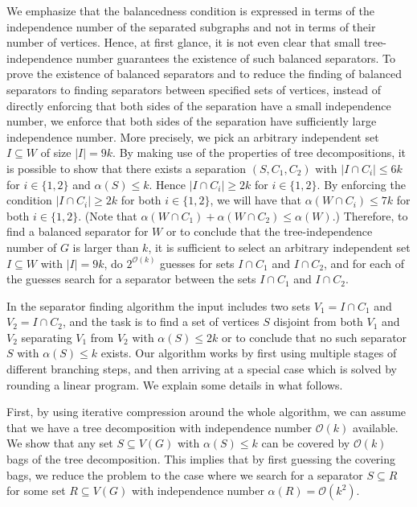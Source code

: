 \documentclass[11pt]{article}
\theoremstyle{definition}
\newcommand{\OO}{\mathcal{O}}
\begin{document}
We emphasize that the balancedness condition is expressed in terms of the independence number of the separated subgraphs and not in terms of their number of vertices.
Hence, at first glance, it is not even clear that small tree-independence number guarantees the existence of such balanced separators.
To prove the existence of balanced separators and to reduce the finding of balanced separators to finding separators between specified sets of vertices, instead of directly enforcing that both sides of the separation have a small independence number, we enforce that both sides of the separation have sufficiently large independence number.
More precisely, we pick an arbitrary independent set $I \subseteq W$ of size $|I| = 9k$. By making use of the properties of tree decompositions,  it is possible to show that there exists a separation $(S, C_1, C_2)$ with $|I \cap C_i| \le 6k$ for $i \in \{1,2\}$ and $\alpha(S) \le k$. Hence  $|I \cap C_i| \ge 2k$ for $i \in \{1,2\}$.
By enforcing the condition  $|I \cap C_i| \ge 2k$ for both $i \in \{1,2\}$, we will have  that $\alpha(W \cap C_i) \le 7k$ for both $i \in \{1,2\}$. (Note that  $\alpha(W \cap C_1) + \alpha(W \cap C_2) \le \alpha(W)$.)
Therefore, to find a balanced separator for $W$ or to conclude that the tree-independence number of $G$ is larger than $k$, it is sufficient to select an arbitrary independent set $I \subseteq W$ with $|I| = 9k$, do $2^{\OO(k)}$ guesses for sets $I \cap C_1$ and $I \cap C_2$, and for each of the guesses search for a separator between the sets $I \cap C_1$ and $I \cap C_2$.


In the separator finding algorithm the input includes two sets $V_1 = I \cap C_1$ and $V_2 = I \cap C_2$, and the task is to find a set of vertices $S$ disjoint from both $V_1$ and $V_2$ separating $V_1$ from $V_2$ with $\alpha(S) \le 2k$ or to conclude that no such separator $S$ with $\alpha(S) \le k$ exists.
Our algorithm works by first using multiple stages of different branching steps, and then arriving at a special case which is solved by rounding a linear program.
We explain some details in what follows.

First, by using iterative compression around the whole algorithm, we can assume that we have a tree decomposition with independence number $\OO(k)$ available.
We show that any set $S \subseteq V(G)$ with $\alpha(S) \le k$ can be covered by $\OO(k)$ bags of the tree decomposition.
This implies that by first guessing the covering bags, we reduce the problem to the case where we search for a separator $S \subseteq R$ for some set $R \subseteq V(G)$ with independence number $\alpha(R) = \OO(k^2)$.
\end{document}
